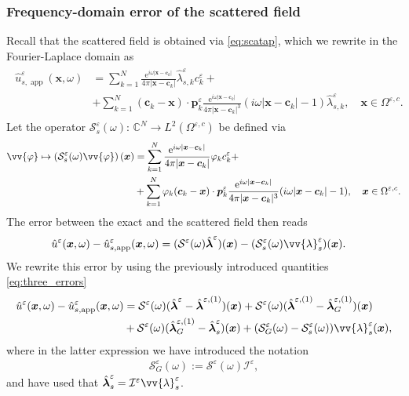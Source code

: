 \documentclass[]{article}
\numberwithin{equation}{section}
\numberwithin{theorem}{section}
\numberwithin{lemma}{section}
\numberwithin{corollary}{section}
\numberwithin{proposition}{section}
\numberwithin{definition}{section}
\newcommand{\bx}{\boldsymbol{x}}
\newcommand{\bc}{\boldsymbol{c}}
\newcommand{\blambda}{\boldsymbol{\lambda}}
\newcommand{\re}{\varepsilon}
\renewcommand{\vec}{\boldsymbol}
\begin{document}
	\subsubsection{Frequency-domain error of the scattered field}
	\label{sec:recovering}
	Recall that the scattered field is obtained via \eqref{eq:scatap}, which we rewrite in the Fourier-Laplace domain as 
	\begin{align}
		\label{eq:fdsys2}
		\begin{split}
			\hat{u}^{\re}_{s,\operatorname{app}}(\vec{x},\omega)&= \sum\limits_{k=1}^N\frac{\mathrm{e}^{i\omega|\bx-\bc_k|}}{4\pi|\bx-\bc_k|}\hat{\lambda}_{s,k}^{\re} c^{\re}_k +\\
			&+\sum\limits_{k=1}^N (\vec{c}_k-\vec{x})\cdot \vec{p}_k^{\re}\frac{\mathrm{e}^{i\omega|\bx-\bc_k|}}{4\pi|\bx-\bc_k|^3}(i\omega|\bx-\bc_k|-1)\hat{\lambda}_{s,k}^{\re}, \quad \vec{x}\in \Omega^{\re,c}.
		\end{split}
	\end{align}
	Let the operator $\mathcal{S}^{\re}_{s}(\omega): \, \mathbb{C}^N\rightarrow L^2(\Omega^{\re,c})$ be defined via 
	\begin{align*}%
		\vv{\varphi} \mapsto 	\left(\mathcal{S}^{\re}_{s}(\omega) \vv{\varphi}\right)(\vec{x})&=\sum\limits_{k=1}^N\frac{\mathrm{e}^{i\omega|\bx-\bc_k|}}{4\pi|\bx-\bc_k|}\varphi_kc_k^{\re} + \\
		&+\sum\limits_{k=1}^N\varphi_k (\vec{c}_k-\vec{x})\cdot \vec{p}_k^{\re}\frac{\mathrm{e}^{i\omega|\bx-\bc_k|}}{4\pi|\bx-\bc_k|^3}(i\omega|\bx-\bc_k|-1), \quad \vec{x}\in \Omega^{\re,c}.
	\end{align*}
	The error between the exact and the scattered field then reads 
	\begin{align*}%
		\hat{u}^{\re}(\vec{x},\omega)-\hat{u}^{\re}_{s, \operatorname{app}}(\vec{x},\omega)&=  (\mathcal{S}^{\re}(\omega)\hat{\vec{\blambda}}^{\re})(\bx)-(\mathcal{S}^{\re}_{s}(\omega)\vv{\lambda}^{\re}_s)(\bx).
	\end{align*}
	We rewrite this error by using the previously introduced quantities \eqref{eq:three_errors}
	\begin{equation}
		\label{eq:four_split}
		\begin{aligned}
			\hat{u}^{\re}(\vec{x},\omega)-\hat{u}^{\re}_{s, \operatorname{app}}(\vec{x},\omega)&=\mathcal{S}^{\re}(\omega)(\hat{\vec{\lambda}}^{\re}-\hat{\vec{\lambda}}^{\re,(1)}) (\bx)
			+\mathcal{S}^{\re}(\omega)(\hat{\vec{\lambda}}^{\re,(1)}-\hat{\vec{\lambda}}^{\re,(1)}_G) (\bx)\\
			&	+\mathcal{S}^{\re}(\omega)(\hat{\vec{\lambda}}^{\re,(1)}_G-\hat{\vec{\lambda}}^{\re}_s)(\bx)+(\mathcal{S}^{\re}_G(\omega)-\mathcal{S}^{\re}_{s}(\omega)) \vv{\lambda}^{\re}_s(\bx),  
		\end{aligned}
	\end{equation}
	where in the latter expression we have introduced the notation 
	\begin{align*}%
		\mathcal{S}_G^{\re}(\omega):=\mathcal{S}^{\re}(\omega)\mathcal{I}^{\re}, 
	\end{align*}
	and have used that  $\hat{\blambda}^{\re}_s=\mathcal{I}^{\re}\vv{\lambda}_s^{\re}$. 
	
\end{document}
